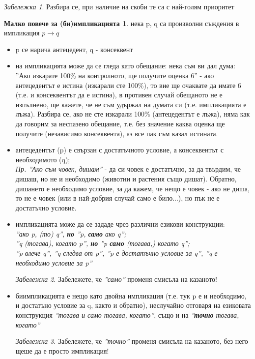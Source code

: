 \documentclass[10pt, a4paper]{article}
\theoremstyle{definition}
\newtheorem*{implication}{Малко повече за (би)импликацията}
\theoremstyle{remark}
\newtheorem*{remark}{Забележка}
\begin{document}
\begin{remark}
    Разбира се, при наличие на скоби те са с най-голям приоритет
\end{remark}
\hfill
\begin{implication}
нека p, q са произволни съждения в импликация \(p\rightarrow q\)
\begin{itemize}
    \item p се нарича антецедент, q - консеквент
    \item на импликацията може да се гледа като обещание: нека съм ви дал дума: ''Ако изкарате 100\% на контролното, ще получите оценка 6'' - ако антецедентът е истина (изкарали сте 100\%), то вие ще очаквате да имате 6 (т.е. и консеквентът да е истина), в противен случай обещаното не е изпълнено, ще кажете, че не съм удържал на думата си (т.е. импликацията е лъжа). Разбира се, ако не сте изкарали 100\% (антецедентът е лъжа), няма как да говорим за неспазено обещание, т.е. без значение каква оценка ще получите (независимо консеквента), аз все пак съм казал истината.
    \item антецедентът (p) е свързан с достатъчното условие, а консеквентът с необходимото (q);\\ \emph{Пр. ''Ако съм човек, дишам''} - да си човек е достатъчно, за да твърдим, че дишаш, но не и необходимо (животни и растения също дишат). Обратно, дишането е необходимо условие, за да кажем, че нещо е човек - ако не диша, то не е човек (или в най-добрия случай само е било...), но пък не е достатъчно условие.
    \item импликацията може да се зададе чрез различни езикови конструкции: \emph{\\''ако p, (то) q'', \textbf{но} ''p, \textbf{само} ако q'';\\ ''q (тогава), когато p'', \textbf{но} ''p \textbf{само} (тогава,) когато q'';\\ ''p влече q'', ''q следва от p'', ''p е достатъчно условие за q'', ''q е необходимо условие за p'' } \\
    \begin{remark}
        Забележете, че \emph{''само''} променя смисъла на казаното!
    \end{remark}    
    \item биимпликацията е нещо като двойна импликация (т.е. тук p е и необходимо, и достатъно условие за q, както и обратно), неслучайно отговаря на езиковата конструкция \emph{''тогава и само тогава, когато''}, също и на \emph{''\textbf{точно} тогава, когато''}\\
    \begin{remark}
        Забележете, че \emph{''точно''} променя смисъла на казаното, без него щеше да е просто импликация!
    \end{remark}   
\end{itemize}

\end{implication}
\end{document}
